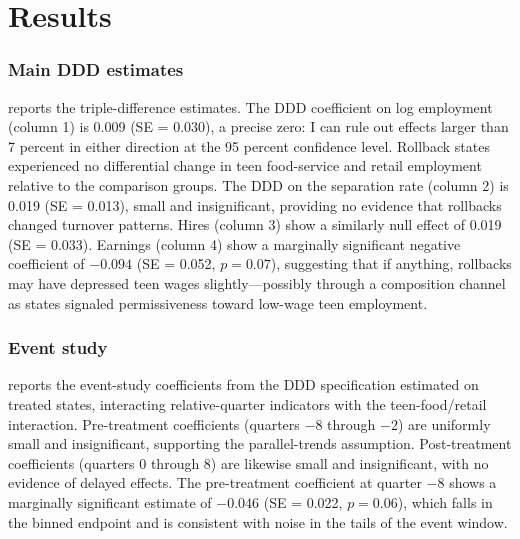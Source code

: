 \documentclass[12pt]{article}
\begin{document}
\section{Results}\label{sec:results}

\subsubsection*{Main DDD estimates}  reports the triple-difference estimates. The DDD coefficient on log employment (column 1) is 0.009 (SE = 0.030), a precise zero: I can rule out effects larger than 7 percent in either direction at the 95 percent confidence level. Rollback states experienced no differential change in teen food-service and retail employment relative to the comparison groups. The DDD on the separation rate (column 2) is 0.019 (SE = 0.013), small and insignificant, providing no evidence that rollbacks changed turnover patterns. Hires (column 3) show a similarly null effect of 0.019 (SE = 0.033). Earnings (column 4) show a marginally significant negative coefficient of $-0.094$ (SE = 0.052, $p = 0.07$), suggesting that if anything, rollbacks may have depressed teen wages slightly---possibly through a composition channel as states signaled permissiveness toward low-wage teen employment.



\subsubsection*{Event study}  reports the event-study coefficients from the DDD specification estimated on treated states, interacting relative-quarter indicators with the teen-food/retail interaction. Pre-treatment coefficients (quarters $-8$ through $-2$) are uniformly small and insignificant, supporting the parallel-trends assumption. Post-treatment coefficients (quarters 0 through 8) are likewise small and insignificant, with no evidence of delayed effects. The pre-treatment coefficient at quarter $-8$ shows a marginally significant estimate of $-0.046$ (SE = 0.022, $p = 0.06$), which falls in the binned endpoint and is consistent with noise in the tails of the event window.


\end{document}
